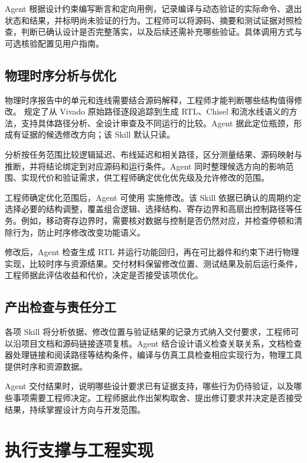 \documentclass[UTF8,fontset=none,zihao=-4,a4paper]{ctexart}
\begin{document}
Agent 根据设计约束编写断言和定向用例，记录编译与动态验证的实际命令、退出状态和结果，并标明尚未验证的行为。工程师可以将源码、摘要和测试证据对照检查，判断已确认设计是否完整落实，以及后续还需补充哪些验证。具体调用方式与可选核验配置见用户指南。

\subsection{物理时序分析与优化}

物理时序报告中的单元和连线需要结合源码解释，工程师才能判断哪些结构值得修改。 规定了从 Vivado 原始路径逐段追踪到生成 RTL、Chisel 和流水线语义的方法，支持具体路径分析、全设计审查及不同运行的比较。Agent 据此定位瓶颈，形成有证据的候选修改方向；该 Skill 默认只读。

分析按任务范围比较逻辑延迟、布线延迟和相关路径，区分测量结果、源码映射与推断，并将结论绑定到对应源码和运行条件。Agent 同时整理候选方向的影响范围、实现代价和验证需求，供工程师确定优化优先级及允许修改的范围。

工程师确定优化范围后，Agent 可使用  实施修改。该 Skill 依据已确认的周期约定选择必要的结构调整，覆盖组合逻辑、选择结构、寄存边界和高扇出控制路径等任务。例如，移动寄存边界时，需要核对数据与控制是否仍然对应，并检查停顿和清除行为，防止时序修改改变功能语义。

修改后，Agent 检查生成 RTL 并运行功能回归，再在可比器件和约束下进行物理实现，比较时序与资源结果。交付材料保留修改位置、测试结果及前后运行条件，工程师据此评估收益和代价，决定是否接受该项优化。

\subsection{产出检查与责任分工}

各项 Skill 将分析依据、修改位置与验证结果的记录方式纳入交付要求，工程师可以沿项目文档和源码链接逐项复核。Agent 结合设计语义检查关联关系，文档检查器处理链接和阅读路径等结构条件，编译与仿真工具检查相应实现行为，物理工具提供时序和资源数据。

Agent 交付结果时，说明哪些设计要求已有证据支持，哪些行为仍待验证，以及哪些事项需要工程师决定。工程师据此作出架构取舍、提出修订要求并决定是否接受结果，持续掌握设计方向与开发范围。

\section{执行支撑与工程实现}
\end{document}
